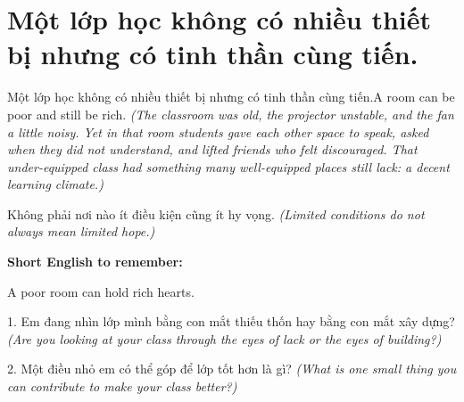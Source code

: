 \section{Một lớp học không có nhiều thiết bị nhưng có tinh thần cùng tiến.}
\begin{truyen}{Một lớp học không có nhiều thiết bị nhưng có tinh thần cùng tiến.}{A room can be poor and still be rich.}
\textit{(The classroom was old, the projector unstable, and the fan a little noisy. Yet in that room students gave each other space to speak, asked when they did not understand, and lifted friends who felt discouraged. That under-equipped class had something many well-equipped places still lack: a decent learning climate.)}
\end{truyen}
\begin{baihoc}
Không phải nơi nào ít điều kiện cũng ít hy vọng.
\textit{(Limited conditions do not always mean limited hope.)}
\end{baihoc}
\begin{ghinhoanh}
\textbf{Short English to remember:}

A poor room can hold rich hearts.
\end{ghinhoanh}
\begin{tuhocnhanh}
1. Em đang nhìn lớp mình bằng con mắt thiếu thốn hay bằng con mắt xây dựng? \textit{(Are you looking at your class through the eyes of lack or the eyes of building?)}

2. Một điều nhỏ em có thể góp để lớp tốt hơn là gì? \textit{(What is one small thing you can contribute to make your class better?)}
\end{tuhocnhanh}
\ngancach

